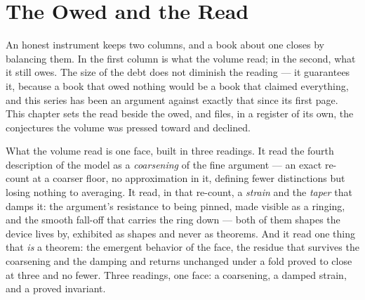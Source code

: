 \chapter{The Owed and the Read}

An honest instrument keeps two columns, and a book about one closes by balancing
them. In the first column is what the volume read; in the second, what it still
owes. The size of the debt does not diminish the reading --- it guarantees it,
because a book that owed nothing would be a book that claimed everything, and this
series has been an argument against exactly that since its first page. This
chapter sets the read beside the owed, and files, in a register of its own, the
conjectures the volume was pressed toward and declined.

What the volume read is one face, built in three readings. It read the fourth
description of the model as a \emph{coarsening} of the fine argument --- an exact
re-count at a coarser floor, no approximation in it, defining fewer distinctions
but losing nothing to averaging. It read, in that re-count, a \emph{strain} and
the \emph{taper} that damps it: the argument's resistance to being pinned, made
visible as a ringing, and the smooth fall-off that carries the ring down --- both
of them shapes the device lives by, exhibited as shapes and never as theorems.
And it read one thing that \emph{is} a theorem: the emergent behavior of the face,
the residue that survives the coarsening and the damping and returns unchanged
under a fold proved to close at three and no fewer. Three readings, one face: a
coarsening, a damped strain, and a proved invariant.


